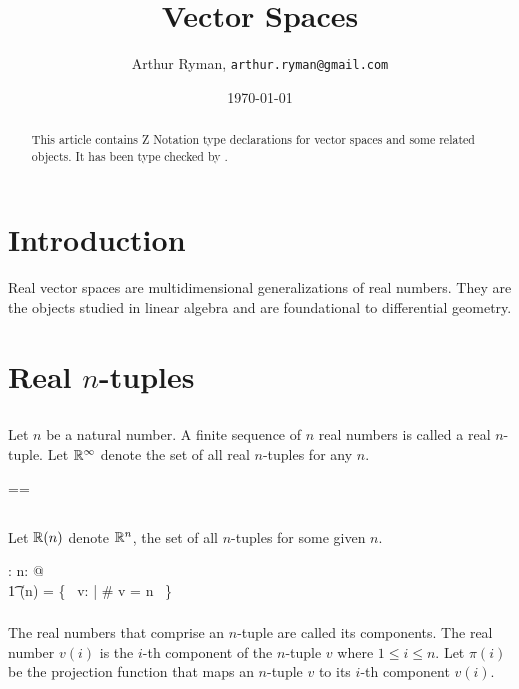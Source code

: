 \documentclass[11pt, oneside]{article}
\title{Vector Spaces}
\author{Arthur Ryman, {\tt arthur.ryman@gmail.com}}
\date{\today}
\begin{document}
\maketitle

\begin{abstract}
This article contains Z Notation type declarations for vector spaces and some related objects.
It has been type checked by \fuzz.
\end{abstract}

\section{Introduction}

Real vector spaces are multidimensional generalizations of real numbers.
They are the objects studied in linear algebra and are foundational to differential geometry.

\section{Real $n$-tuples}

\subsection{}

Let $n$ be a natural number.
A finite sequence of $n$ real numbers is called a real $n$-tuple.
Let $\mathbb{R}^\infty$ denote the set of all real $n$-tuples for any $n$.

\begin{zed}
	\Rinf == \seq \R
\end{zed}

\subsection{}

Let $\mathbb{R}(n)$ denote $\mathbb{R}^n$, the set of all $n$-tuples for some given $n$.
\begin{axdef}
	\Rtuples: \nat \fun \power \Rinf
\where
	\forall n: \nat @ \\
	\t1	\Rtuples(n) = \{~ v: \Rinf | \# v = n ~\}
\end{axdef}

\subsubsection{}

The real numbers that comprise an $n$-tuple are called its components.
The real number $v(i)$ is the $i$-th component of the $n$-tuple $v$ where
$1 \le i \le n$.
Let $\pi(i)$ be the projection function that maps an $n$-tuple $v$ to its $i$-th component $v(i)$.
\end{document}
